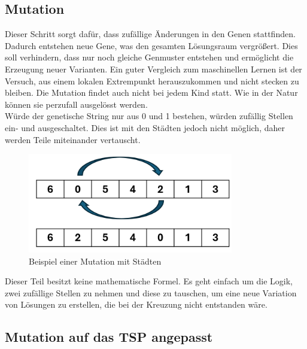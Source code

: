 %
%
%
%
\subsection{Mutation
\label{buch:paper:varalg:subsection:mutation}}
Dieser Schritt sorgt dafür, dass zufällige Änderungen in 
den Genen stattfinden. Dadurch entstehen neue Gene, was den 
gesamten Lösungsraum vergrößert. Dies soll verhindern, 
dass nur noch gleiche Genmuster entstehen und ermöglicht 
die Erzeugung neuer Varianten. Ein guter Vergleich zum 
maschinellen Lernen ist der Versuch, aus einem lokalen 
Extrempunkt herauszukommen und nicht stecken zu bleiben.
Die Mutation findet auch nicht bei jedem Kind statt. Wie 
in der Natur können sie perzufall ausgelösst werden.
\\
Würde der genetische String nur aus 0 und 1 bestehen, 
würden zufällig Stellen ein- und ausgeschaltet. Dies 
ist mit den Städten jedoch nicht möglich, daher werden 
Teile miteinander vertauscht.

\begin{figure}
	\centering
	\includegraphics[width=0.8\textwidth]{
        papers/varalg/images/teil3/09GeneticStringCitiesMutation.png
        }
	\caption{Beispiel einer Mutation mit Städten}
	\label{fig:mutation_genetic_string}
\end{figure}

Dieser Teil besitzt keine mathematische Formel. Es geht einfach 
um die Logik, zwei zufällige Stellen zu nehmen und diese zu 
tauschen, um eine neue Variation von Lösungen zu erstellen, die 
bei der Kreuzung nicht entstanden wäre.


\subsection{Mutation auf das TSP angepasst
\label{buch:paper:varalg:subsection:mutation_tsp}}


